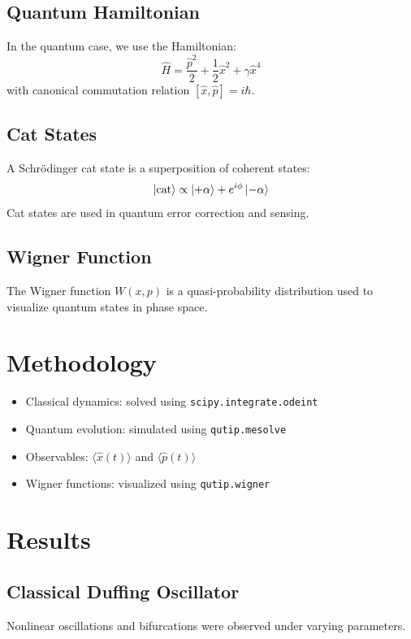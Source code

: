 \documentclass[conference]{IEEEtran}
\begin{document}
\subsection{Quantum Hamiltonian}
In the quantum case, we use the Hamiltonian:
\begin{equation}
    \hat{H} = \frac{\hat{p}^2}{2} + \frac{1}{2} \hat{x}^2 + \gamma \hat{x}^4
\end{equation}
with canonical commutation relation $[\hat{x}, \hat{p}] = i\hbar$.

\subsection{Cat States}
A Schr\"odinger cat state is a superposition of coherent states:
\begin{equation}
    \ket{\text{cat}} \propto \ket{+\alpha} + e^{i\phi}\ket{-\alpha}
\end{equation}
Cat states are used in quantum error correction and sensing.

\subsection{Wigner Function}
The Wigner function $W(x, p)$ is a quasi-probability distribution used to visualize quantum states in phase space.

\section{Methodology}
\begin{itemize}
    \item Classical dynamics: solved using \texttt{scipy.integrate.odeint}
    \item Quantum evolution: simulated using \texttt{qutip.mesolve}
    \item Observables: $\langle \hat{x}(t) \rangle$ and $\langle \hat{p}(t) \rangle$
    \item Wigner functions: visualized using \texttt{qutip.wigner}
\end{itemize}

\section{Results}
\subsection{Classical Duffing Oscillator}
Nonlinear oscillations and bifurcations were observed under varying parameters.
\end{document}
